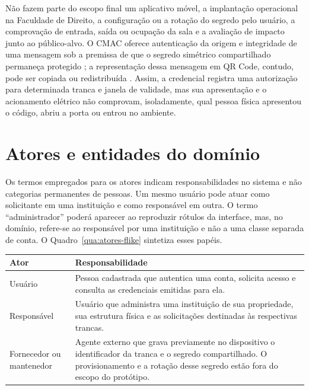 Não fazem parte do escopo final um aplicativo móvel, a implantação operacional na Faculdade de Direito, a configuração ou a rotação do segredo pelo usuário, a comprovação de entrada, saída ou ocupação da sala e a avaliação de impacto junto ao público-alvo. O CMAC oferece autenticação da origem e integridade de uma mensagem sob a premissa de que o segredo simétrico compartilhado permaneça protegido \cite{nist2005cmac,barker2020keymanagement}; a representação dessa mensagem em QR Code, contudo, pode ser copiada ou redistribuída \cite{kieseberg2010qrcode}. Assim, a credencial registra uma autorização para determinada tranca e janela de validade, mas sua apresentação e o acionamento elétrico não comprovam, isoladamente, qual pessoa física apresentou o código, abriu a porta ou entrou no ambiente.

\section{Atores e entidades do domínio}

Os termos empregados para os atores indicam responsabilidades no sistema e não categorias permanentes de pessoas. Um mesmo usuário pode atuar como solicitante em uma instituição e como responsável em outra. O termo ``administrador'' poderá aparecer ao reproduzir rótulos da interface, mas, no domínio, refere-se ao responsável por uma instituição e não a uma classe separada de conta. O Quadro~\ref{qua:atores-flike} sintetiza esses papéis.

\begin{quadro}[htb]
    \caption{Atores do FLIKE}
    \label{qua:atores-flike}
    \small
    \begin{tabular}{|p{}|p{}|}
        \hline
        \textbf{Ator} & \textbf{Responsabilidade} \\ \hline
        Usuário & Pessoa cadastrada que autentica uma conta, solicita acesso e consulta as credenciais emitidas para ela. \\ \hline
        Responsável & Usuário que administra uma instituição de sua propriedade, sua estrutura física e as solicitações destinadas às respectivas trancas. \\ \hline
        Fornecedor ou mantenedor & Agente externo que grava previamente no dispositivo o identificador da tranca e o segredo compartilhado. O provisionamento e a rotação desse segredo estão fora do escopo do protótipo. \\ \hline
    \end{tabular}
\end{quadro}

